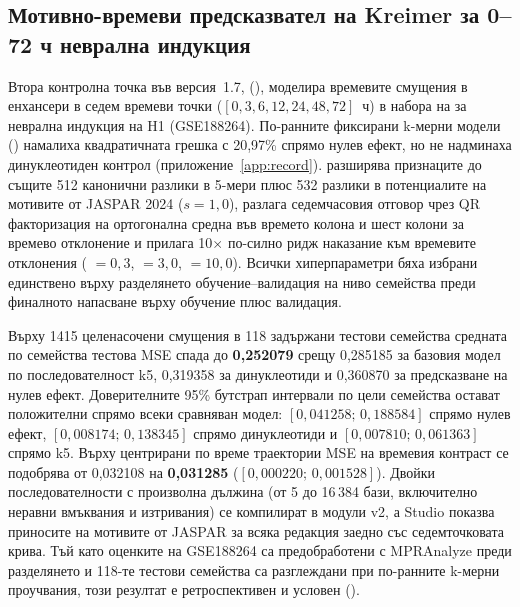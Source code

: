 \documentclass[10.5pt,a4paper]{article}
\begin{document}
\subsection{Мотивно-времеви предсказвател на Kreimer за 0–72 ч неврална индукция}\label{sec:kreimer}

Втора контролна точка във версия~1.7,  (), моделира времевите смущения в енхансери в седем времеви точки ($[0, 3, 6, 12, 24, 48, 72]$~ч) в набора на \citet{kreimer2022} за неврална индукция на H1 (GSE188264). По-ранните фиксирани k-мерни модели () намалиха квадратичната грешка с 20,97\% спрямо нулев ефект, но не надминаха динуклеотиден контрол (приложение~\ref{app:record}).  разширява признаците до същите 512 канонични разлики в 5-мери плюс 532 разлики в потенциалите на мотивите от JASPAR 2024 ($s=1{,}0$), разлага седемчасовия отговор чрез QR факторизация на ортогонална средна във времето колона и шест колони за времево отклонение и прилага 10$\times$ по-силно ридж наказание към времевите отклонения ( $=0{,}3$,  $=3{,}0$,  $=10{,}0$). Всички хиперпараметри бяха избрани единствено върху разделянето обучение–валидация на ниво семейства преди финалното напасване върху обучение плюс валидация.

Върху 1415 целенасочени смущения в 118 задържани тестови семейства средната по семейства тестова MSE спада до \textbf{0,252079} срещу 0,285185 за базовия модел по последователност k5, 0,319358 за динуклеотиди и 0,360870 за предсказване на нулев ефект. Доверителните 95\% бутстрап интервали по цели семейства остават положителни спрямо всеки сравняван модел: $[0{,}041258;\, 0{,}188584]$ спрямо нулев ефект, $[0{,}008174;\, 0{,}138345]$ спрямо динуклеотиди и $[0{,}007810;\, 0{,}061363]$ спрямо k5. Върху центрирани по време траектории MSE на времевия контраст се подобрява от 0,032108 на \textbf{0,031285} ($[0{,}000220;\, 0{,}001528]$). Двойки последователности с произволна дължина (от 5 до 16\,384 бази, включително неравни вмъквания и изтривания) се компилират в модули  v2, а Studio показва приносите на мотивите от JASPAR за всяка редакция заедно със седемточковата крива. Тъй като оценките на GSE188264 са предобработени с MPRAnalyze преди разделянето и 118-те тестови семейства са разглеждани при по-ранните k-мерни проучвания, този резултат е ретроспективен и условен ().
\end{document}
